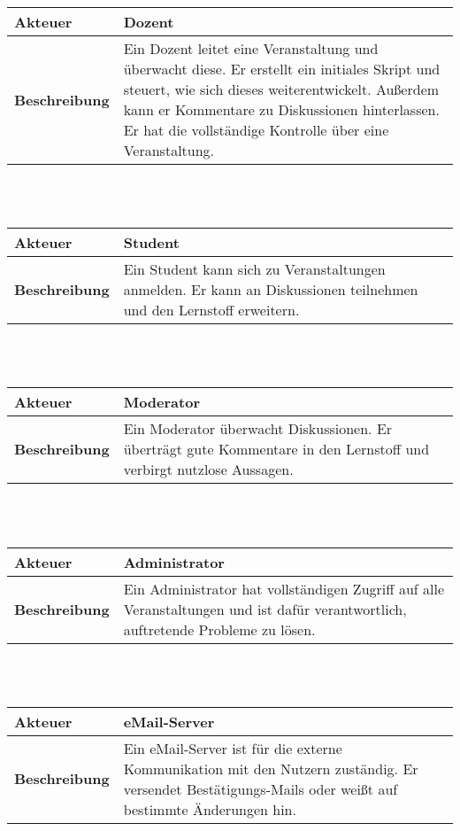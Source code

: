 \documentclass[12pt,a4paper]{article}
\begin{document}
\begin{tabular}{l p{10cm}}
\hline \textbf{Akteuer} & Dozent \\ 
\hline \textbf{Beschreibung} & Ein Dozent leitet eine Veranstaltung und überwacht diese. Er erstellt ein initiales Skript und steuert, wie sich dieses weiterentwickelt. Außerdem kann er Kommentare zu Diskussionen hinterlassen. Er hat die vollständige Kontrolle über eine Veranstaltung.\\ 
\hline 
\end{tabular}\\\\

\begin{tabular}{l p{10cm}}
\hline \textbf{Akteuer} & Student \\ 
\hline \textbf{Beschreibung} & Ein Student kann sich zu Veranstaltungen anmelden. Er kann an Diskussionen teilnehmen und den Lernstoff erweitern.\\ 
\hline 
\end{tabular}\\\\

\begin{tabular}{l p{10cm}}
\hline \textbf{Akteuer} & Moderator \\ 
\hline \textbf{Beschreibung} & Ein Moderator überwacht Diskussionen. Er überträgt gute Kommentare in den Lernstoff und verbirgt nutzlose Aussagen.\\ 
\hline 
\end{tabular}\\\\

\begin{tabular}{l p{10cm}}
\hline \textbf{Akteuer} & Administrator \\ 
\hline \textbf{Beschreibung} & Ein Administrator hat vollständigen Zugriff auf alle Veranstaltungen und ist dafür verantwortlich, auftretende Probleme zu lösen. \\ 
\hline 
\end{tabular}\\\\

\begin{tabular}{l p{10cm}}
\hline \textbf{Akteuer} & eMail-Server \\ 
\hline \textbf{Beschreibung} & Ein eMail-Server ist für die externe Kommunikation mit den Nutzern zuständig. Er versendet Bestätigungs-Mails oder weißt auf bestimmte Änderungen hin. \\ 
\hline 
\end{tabular}\\\\
\end{document}
